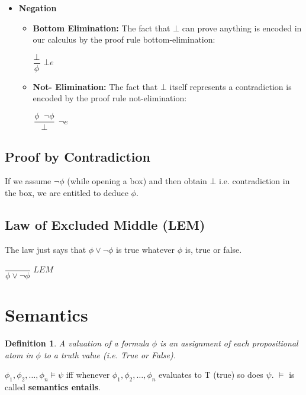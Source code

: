 \documentclass{report}
\newtheorem{definition}{Definition}[chapter]
\begin{document}
\begin{itemize}
        \item{\textbf{Negation}}
            \begin{itemize}
                \item \textbf{Bottom Elimination:} The fact that $\bot$ can prove anything is encoded in our calculus by the proof rule bottom-elimination:
                    \begin{center}
                        $\dfrac{\bot}{\phi}$ $\bot e$
                    \end{center}
                \item \textbf{Not- Elimination:} The fact that $\bot$ itself represents a contradiction is encoded by the proof rule not-elimination: 
                     \begin{center}
                         $\dfrac{\phi \hspace{0.2cm} \neg \phi}{\bot}$ $\neg e$
                     \end{center}
            \end{itemize}
\end{itemize}

\subsection{Proof by Contradiction}
If we assume $\neg \phi$ (while opening a box) and then obtain $\bot$ i.e. contradiction in the box, we are entitled to deduce $\phi$. \\
\par

\subsection{Law of Excluded Middle (LEM)}
The law just says that $\phi \vee \neg \phi$ is true whatever $\phi$ is, true or false. 
\begin{center}
    $\dfrac{ }{\phi \vee \neg \phi}$ $LEM$
\end{center}


\section{Semantics}
\begin{definition}{}
A \textit{valuation} of a formula $\phi$ is an assignment of each propositional atom in $\phi$ to a truth value (i.e. True or False).
\end{definition}
$\phi_1, \phi_2,\ldots, \phi_n \vDash \psi$ iff whenever $\phi_1, \phi_2,\ldots, \phi_n$ evaluates to T (true) so does $\psi$. $\vDash$ is called \textbf{semantics entails}. 
\end{document}

